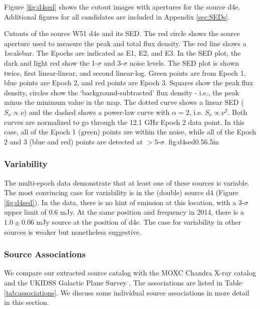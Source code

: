 Figure \ref{fig:d4sed} shows the cutout images with apertures for the source
d4e.  Additional figures for all candidates are included in Appendix
\ref{sec:SEDs}.

{Cutouts of the source W51 d4e and its SED.
The red circle shows the source aperture used to measure the peak and total
flux density.  The red line shows a 1\arcsec scalebar.  The Epochs are indicated as E1,
E2, and E3.
In the SED plot, the dark and light red show the 1-$\sigma$ and 3-$\sigma$
noise levels.  The SED plot is shown twice, first linear-linear, and second
linear-log.
Green points are from Epoch 1, blue points are Epoch 2, and red points are
Epoch 3.  Squares show the peak flux density, circles show the
`background-subtracted' flux density - i.e., the peak minus the minimum value
in the map.
The dotted curve shows a linear SED ($S_\nu \propto \nu$) and the dashed shows
a power-law curve with $\alpha=2$, i.e. $S_\nu \propto \nu^2$.  Both curves are
normalized to go through the 12.1 GHz Epoch 2 data point.  In this case, all of
the Epoch 1 (green) points are within the noise, while all of the Epoch 2 and 3
(blue and red) points are detected at $>5$-$\sigma$.
}
{fig:d4sed}{0.5}{6.5in}

\subsubsection{Variability}
\label{sec:variability}
The multi-epoch data demonstrate that at least one of these sources is
variable.  The most convincing case for variability is in the (double) source
d4 (Figure \ref{fig:d4sed}).  In the \citet{Mehringer1994a} data, there is no
hint of emission at this location, with a 3-$\sigma$ upper limit of 0.6 mJy.
At the same position and frequency in 2014, there is a $1.0 \pm 0.06$ mJy
source at the position of d4e.  The case for variability in other sources is
weaker but nonetheless suggestive.


\subsubsection{Source Associations}
\label{sec:associations}
We compare our extracted source catalog with the MOXC Chandra X-ray catalog
\citep{Townsley2014a} and the UKIDSS Galactic Plane Survey
\citep[UGPS;][]{Lucas2008a}.  The associations are listed in Table
\ref{tab:associations}.  We discuss some
individual source associations in more detail in this section.

